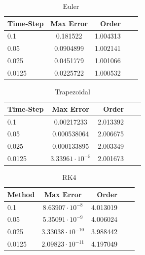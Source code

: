 \documentclass[12pt]{article}
\begin{document}
\begin{table}[bht]
\begin{center}
\begin{tabular}{|l|c|r|c|c|}
\hline
Time-Step& Max Error & Order \\ \hline
0.1& 0.181522& 1.004313 \\ \hline
0.05& 0.0904899& 1.002141 \\ \hline
0.025& 0.0451779& 1.001066 \\ \hline
0.0125& 0.0225722& 1.000532 \\ \hline

\end{tabular}
\end{center}
\caption{Euler}
\end{table}

\begin{table}[bht]
\begin{center}
\begin{tabular}{|l|c|r|c|c|}
\hline
Time-Step& Max Error & Order \\ \hline
0.1& 0.00217233& 2.013392 \\ \hline
0.05& 0.000538064& 2.006675 \\ \hline
0.025& 0.000133895& 2.003349 \\ \hline
0.0125& $3.33961\cdot10^{-5}$& 2.001673 \\ \hline

\end{tabular}
\end{center}
\caption{Trapezoidal}
\end{table}

\begin{table}[bht]
\begin{center}
\begin{tabular}{|l|c|r|c|c|}
\hline
Method& Max Error & Order \\ \hline
0.1& $8.63907\cdot10^{-8}$& 4.013019 \\ \hline
0.05& $5.35091\cdot10^{-9}$& 4.006024 \\ \hline
0.025& $3.33038\cdot10^{-10}$& 3.988442\\ \hline
0.0125& $2.09823\cdot10^{-11}$& 4.197049\\ \hline
\end{tabular}
\end{center}
\caption{RK4} \label{tab::A_Table}
\end{table}
\end{document}
